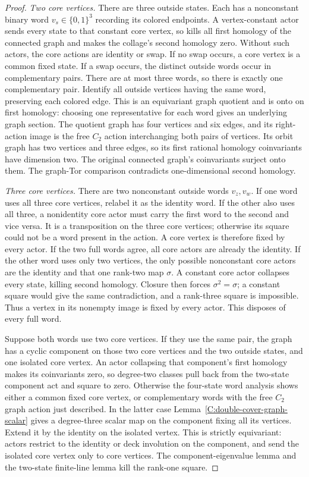 \begin{proof}
\emph{Two core vertices.}
There are three outside states. Each has a nonconstant
binary word $v_s\in\{0,1\}^3$ recording its colored
endpoints. A vertex-constant actor sends every state to
that constant core vertex, so kills all first homology
of the connected graph and makes the collage's second
homology zero. Without such actors, the core actions are
identity or swap. If no swap occurs, a core vertex is a
common fixed state.
If a swap occurs, the distinct outside words occur in
complementary pairs. There are at most three words, so
there is exactly one complementary pair. Identify all
outside vertices having the same word, preserving each
colored edge. This is an equivariant graph quotient and
is onto on first homology: choosing one representative
for each word gives an underlying graph section.
The quotient graph has four vertices and six edges, and
its right-action image is the free $C_2$ action interchanging
both pairs of vertices. Its orbit graph has two vertices
and three edges, so its first rational homology coinvariants
have dimension two. The original connected graph's
coinvariants surject onto them. The graph-Tor comparison
contradicts one-dimensional second homology.

\emph{Three core vertices.}
There are two nonconstant outside words $v_z,v_w$.
If one word uses all three core vertices, relabel it as
the identity word. If the other also uses all three, a
nonidentity core actor must carry the first word to the
second and vice versa. It is a transposition on the three
core vertices; otherwise its square could not be a word
present in the action. A core vertex is therefore fixed
by every actor. If the two full words agree, all core
actors are already the identity.
If the other word uses only two vertices, the only
possible nonconstant core actors are the identity and
that one rank-two map $\sigma$. A constant core actor
collapses every state, killing second homology.
Closure then forces $\sigma^2=\sigma$; a constant square
would give the same contradiction, and a rank-three square
is impossible. Thus a vertex in its nonempty image is fixed
by every actor. This disposes of every full word.

Suppose both words use two core vertices. If they use the
same pair, the graph has a cyclic component on those two
core vertices and the two outside states, and one isolated
core vertex. An actor collapsing that component's first
homology makes its coinvariants zero, so degree-two classes
pull back from the two-state component act and square to
zero. Otherwise the four-state word analysis shows either
a common fixed core vertex, or complementary words with
the free $C_2$ graph action just described.
In the latter case Lemma~\ref{C:double-cover-graph-scalar}
gives a degree-three scalar map on the component fixing
all its vertices. Extend it by the identity on the isolated
vertex. This is strictly equivariant: actors restrict to
the identity or deck involution on the component, and
send the isolated core vertex only to core vertices.
The component-eigenvalue lemma and the two-state finite-line
lemma kill the rank-one square.


\end{proof}
